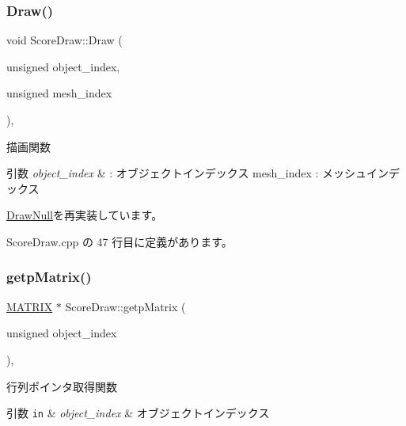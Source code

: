 \subsubsection{\texorpdfstring{Draw()}{Draw()}}
{\footnotesize\ttfamily void Score\+Draw\+::\+Draw (\begin{DoxyParamCaption}\item[{unsigned}]{object\+\_\+index,  }\item[{unsigned}]{mesh\+\_\+index }\end{DoxyParamCaption})\hspace{0.3cm}{\ttfamily [override]}, {\ttfamily [virtual]}}



描画関数 


\begin{DoxyParams}{引数}
{\em object\+\_\+index} & \+: オブジェクトインデックス mesh\+\_\+index \+: メッシュインデックス \\
\hline
\end{DoxyParams}


\mbox{\hyperlink{class_draw_null_a72ac0b7dc40b1469582419dcc5b0e114}{Draw\+Null}}を再実装しています。



 Score\+Draw.\+cpp の 47 行目に定義があります。

\mbox{\label{class_score_draw_adb995c83624c2eab8b8a15d1182df5b8}} 
\subsubsection{\texorpdfstring{getp\+Matrix()}{getpMatrix()}}
{\footnotesize\ttfamily \mbox{\hyperlink{_vector3_d_8h_a032295cd9fb1b711757c90667278e744}{M\+A\+T\+R\+IX}} $\ast$ Score\+Draw\+::getp\+Matrix (\begin{DoxyParamCaption}\item[{unsigned}]{object\+\_\+index }\end{DoxyParamCaption})\hspace{0.3cm}{\ttfamily [override]}, {\ttfamily [virtual]}}



行列ポインタ取得関数 


\begin{DoxyParams}[1]{引数}
\mbox{\tt in}  & {\em object\+\_\+index} & オブジェクトインデックス \\
\hline
\end{DoxyParams}

